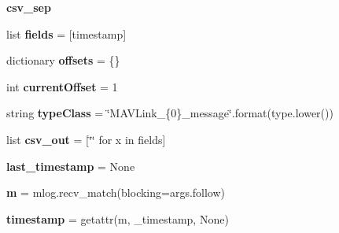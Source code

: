 \begin{DoxyCompactItemize}
\mbox{\label{namespacepymavlink_1_1tools_1_1mavlogdump_a98d87b66146b93f20c0690e737b3cb8b}} 
{\bfseries csv\+\_\+sep}
\item 
\mbox{\label{namespacepymavlink_1_1tools_1_1mavlogdump_a8a7ca8e476c5e470f5fff33b76b6abb0}} 
list {\bfseries fields} = \mbox{[}\textquotesingle{}timestamp\textquotesingle{}\mbox{]}
\item 
\mbox{\label{namespacepymavlink_1_1tools_1_1mavlogdump_a939d06fcf84e8a17666d2f1503bc7ea5}} 
dictionary {\bfseries offsets} = \{\}
\item 
\mbox{\label{namespacepymavlink_1_1tools_1_1mavlogdump_a8b9296936da54456876bff3ebdea1772}} 
int {\bfseries current\+Offset} = 1
\item 
\mbox{\label{namespacepymavlink_1_1tools_1_1mavlogdump_ac7f442d05e751559a14b0ca409556f09}} 
string {\bfseries type\+Class} = \char`\"{}M\+A\+V\+Link\+\_\+\{0\}\+\_\+message\char`\"{}.format(type.\+lower())
\item 
\mbox{\label{namespacepymavlink_1_1tools_1_1mavlogdump_afe3b16924e9b873155d166fd727643e3}} 
list {\bfseries csv\+\_\+out} = \mbox{[}\char`\"{}\char`\"{} for x in fields\mbox{]}
\item 
\mbox{\label{namespacepymavlink_1_1tools_1_1mavlogdump_a53ff4c2645da546179bd721de494e04a}} 
{\bfseries last\+\_\+timestamp} = None
\item 
\mbox{\label{namespacepymavlink_1_1tools_1_1mavlogdump_ad6f8303b7b10c5216189a5b97e662b84}} 
{\bfseries m} = mlog.\+recv\+\_\+match(blocking=args.\+follow)
\item 
\mbox{\label{namespacepymavlink_1_1tools_1_1mavlogdump_a48f60cea754ecb290fd64f00e0ed6840}} 
{\bfseries timestamp} = getattr(m, \textquotesingle{}\+\_\+timestamp\textquotesingle{}, None)
\item 

\end{DoxyCompactItemize}
